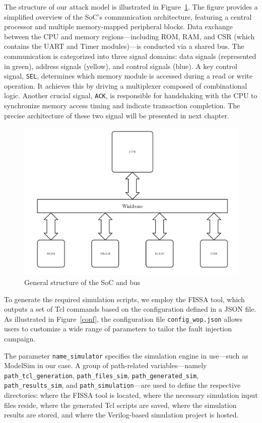 The structure of our attack model is illustrated in Figure~\ref{general}. The figure provides a simplified overview of the SoC’s communication architecture, featuring a central processor and multiple memory-mapped peripheral blocks. Data exchange between the CPU and memory regions—including ROM, RAM, and CSR (which contains the UART and Timer modules)—is conducted via a shared bus. The communication is categorized into three signal domains: data signals (represented in green), address signals (yellow), and control signals (blue). A key control signal, \texttt{SEL}, determines which memory module is accessed during a read or write operation. It achieves this by driving a multiplexer composed of combinational logic. Another crucial signal, \texttt{ACK}, is responsible for handshaking with the CPU to synchronize memory access timing and indicate transaction completion. The precise architecture of these two signal will be presented in next chapter.

\begin{figure}[t!]
  \centering
  \includegraphics[width=\linewidth]{Chapitre3/figures/general.png}
  \caption{General structure of the SoC and bus}
  \label{general}
\end{figure}

To generate the required simulation scripts, we employ the FISSA tool, which outputs a set of Tcl commands based on the configuration defined in a JSON file. As illustrated in Figure~\ref{conf}, the configuration file \texttt{config\_wop.json} allows users to customize a wide range of parameters to tailor the fault injection campaign.

The parameter \texttt{name\_simulator} specifies the simulation engine in use—such as ModelSim in our case. A group of path-related variables—namely \texttt{path\_tcl\_generation}, \texttt{path\_files\_sim}, \texttt{path\_generated\_sim}, \texttt{path\_results\_sim}, and \texttt{path\_simulation}—are used to define the respective directories: where the FISSA tool is located, where the necessary simulation input files reside, where the generated Tcl scripts are saved, where the simulation results are stored, and where the Verilog-based simulation project is hosted.

